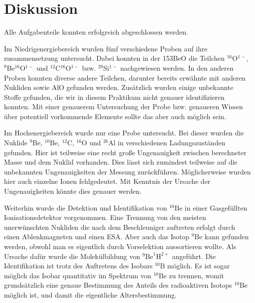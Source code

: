 \section{Diskussion}

Alle Aufgabenteile konnten erfolgreich abgeschlossen werden.

Im Niedrigenergiebereich wurden fünf verschiedene Proben auf ihre zusammensetzung untersucht.
Dabei konnten in der 153BeO die Teilchen $^{16}$O$^{1-}$, $^{9}$Be$^{16}$O$^{1-}$ und $^{12}$C$^{16}$O$^{1-}$ bzw. $^{28}$Si$^{1-}$ nachgewiesen werden.
In den anderen Proben konnten diverse andere Teilchen, darunter bereits erwähnte mit anderen Nukliden sowie AlO gefunden werden.
Zusätzlich wurden einige unbekannte Stoffe gefunden, die wir in diesem Praktikum nicht genauer identifizieren konnten.
Mit einer genauerem Untersuchung der Probe bzw. genaueren Wissen über potentiell vorkommende Elemente sollte das aber auch möglich sein.

Im Hochenergiebereich wurde nur eine Probe untersucht.
Bei dieser wurden die Nuklide $^{9}$Be, $^{10}$Be, $^{12}$C, $^{16}$O und $^{26}$Al in verschiedenen Ladungszuständen gefunden.
Hier ist teilweise eine recht große Ungenauigkeit zwischen berechneter Masse und dem Nuklid vorhanden.
Dies lässt sich zumindest teilweise auf die unbekannten Ungenauigkeiten der Messung zurückführen.
Möglicherweise wurden hier auch einzelne Ionen fehlgedeutet.
Mit Kenntnis der Ursache der Ungenauigkeiten könnte dies genauer werden.

Weiterhin wurde die Detektion und Identifikation von $^{10}\text{Be}$ in einer Gasgefüllten Ionisationsdetektor vorgenommen.
Eine Trennung von den meisten unerwünschten Nukliden die nach dem Beschleuniger auftreten erfolgt durch einen Ablenkmagneten und einen ESA.
Aber auch das Isotop $^{9}\text{Be}$ kann gefunden werden, obwohl man es eigentlich durch Vorselektion aussortieren wollte.
Als Ursache dafür wurde die Molekülbildung von $^{9}\text{Be}^{1}\text{H}^{2+}$ angeführt.
Die Identifikation ist trotz des Auftretens des Isobars $^{10}\text{B}$ möglich.
Es ist sogar möglich das Isobar quantitativ im Spektrum von $^{10}\text{Be}$ zu trennen, womit grundsätzlich eine genaue Bestimmung des Anteils des radioaktiven Isotops $^{10}\text{Be}$ möglich ist, und damit die eigentliche Altersbestimmung.

